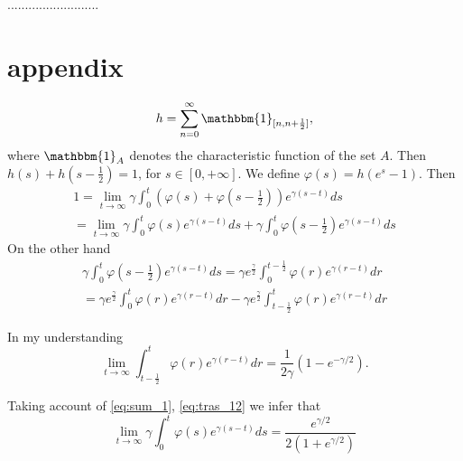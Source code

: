 \documentclass[a4paper,10pt]{article}
\theoremstyle{remark}
\begin{document}
..........................


\section{appendix}



\[
 h=\sum_{n=0}^{\infty}\mathbbm{1}_{[n,n+\frac12]},
\]
where $\mathbbm{1}_{A}$ denotes the characteristic function of the set $A$.  Then $h(s)+h(s-\frac12)=1$, for $s\in [0,+\infty]$. 
We define $\varphi(s)=h(e^s-1)$. Then
\begin{multline}\label{eq:sum_1}
 1=\lim\limits_{t\to\infty}\gamma\int_0^t \left(\varphi(s)+\varphi\left(s-\frac12\right)
 \right) e^{\gamma (s-t)}ds\\=\lim\limits_{t\to\infty}\gamma\int_0^t\varphi(s)e^{\gamma (s-t)}ds+ \gamma\int_0^t \varphi\left(s-\frac12\right)
  e^{\gamma (s-t)}ds
\end{multline}
On the other hand
\begin{multline}\label{eq:tras_12}
 \gamma\int_0^t \varphi\left(s-\frac12\right)
  e^{\gamma (s-t)}ds= \gamma e^{\frac{\gamma}{2}}\int_0^{t-\frac12} \varphi\left(r\right)
  e^{\gamma (r-t)}dr\\=\gamma e^{\frac{\gamma}{2}}\int_0^{t} \varphi\left(r\right)
  e^{\gamma (r-t)}dr-
  \gamma e^{\frac{\gamma}{2}}\int_{t-\frac12}^{t} \varphi\left(r\right)
  e^{\gamma (r-t)}dr
\end{multline}

In my understanding
\[
\lim\limits_{t\to\infty} \int_{t-\frac12}^{t} \varphi\left(r\right)
  e^{\gamma (r-t)}dr= \frac{1}{2\gamma}(1-e^{-\gamma/2}).
\]

Taking account of \eqref{eq:sum_1}, \eqref{eq:tras_12} we infer that 
\[
\lim\limits_{t\to\infty} \gamma \int_{0}^{t} \varphi\left(s\right)
  e^{\gamma (s-t)}ds=\frac{e^{\gamma/2}}{2(1+e^{\gamma/2})}
\]


  
  
\end{document}

